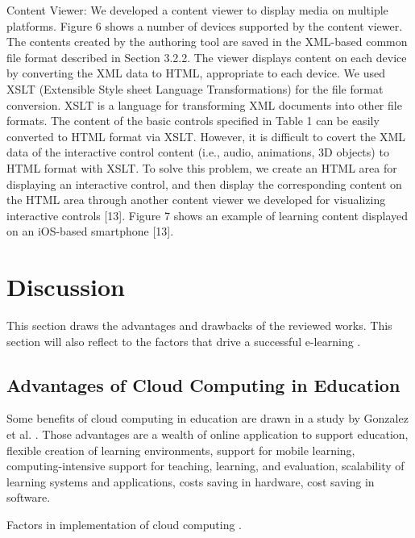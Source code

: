 \documentclass[journal]{vgtc}                %
\begin{document}
  Content Viewer: We developed a content viewer to display media on multiple platforms. Figure 6 shows a number of devices supported by the content viewer. The contents created by the authoring tool are saved in the XML-based common file format described in Section 3.2.2. The viewer displays content on each device by converting the XML data to HTML, appropriate to each device. We used XSLT (Extensible Style sheet Language Transformations) for the file format conversion. XSLT is a language for transforming XML documents into other file formats. The content of the basic controls specified in Table 1 can be easily converted to HTML format via XSLT. However, it is difficult to covert the XML data of the interactive control content (i.e., audio, animations, 3D objects) to HTML format with XSLT. To solve this problem, we create an HTML area for displaying an interactive control, and then display the corresponding content on the HTML area through another content viewer we developed for visualizing interactive controls [13]. Figure 7 shows an example of learning content displayed on an iOS-based smartphone [13].

\section{Discussion}
This section draws the advantages and drawbacks of the reviewed works. This section will also reflect to the factors that drive a successful e-learning \cite{Sun2008}.

  \subsection{Advantages of Cloud Computing in Education}
  Some benefits of cloud computing in education are drawn in a study by Gonzalez et al. \cite{Gonzalez-Martinez2014}. Those advantages are a wealth of online application to support education, flexible creation of learning environments, support for mobile learning, computing-intensive support for teaching, learning, and evaluation, scalability of learning systems and applications, costs saving in hardware, cost saving in software.

  Factors in implementation of cloud computing \cite{morgan2013factors}.

\end{document}
